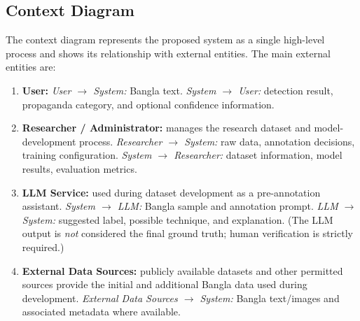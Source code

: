 \documentclass[12pt,a4paper]{report}
\begin{document}
\subsection{Context Diagram}
The context diagram represents the proposed system as a single high-level process
and shows its relationship with external entities. The main external entities are:
\begin{enumerate}
  \item \textbf{User:} \emph{User $\rightarrow$ System:} Bangla text.
        \emph{System $\rightarrow$ User:} detection result, propaganda category,
        and optional confidence information.
  \item \textbf{Researcher / Administrator:} manages the research dataset and
        model-development process. \emph{Researcher $\rightarrow$ System:} raw
        data, annotation decisions, training configuration.
        \emph{System $\rightarrow$ Researcher:} dataset information, model
        results, evaluation metrics.
  \item \textbf{LLM Service:} used during dataset development as a pre-annotation
        assistant. \emph{System $\rightarrow$ LLM:} Bangla sample and annotation
        prompt. \emph{LLM $\rightarrow$ System:} suggested label, possible
        technique, and explanation. (The LLM output is \emph{not} considered the
        final ground truth; human verification is strictly required.)
  \item \textbf{External Data Sources:} publicly available datasets and other
        permitted sources provide the initial and additional Bangla data used
        during development. \emph{External Data Sources $\rightarrow$ System:}
        Bangla text/images and associated metadata where available.
\end{enumerate}
\end{document}
